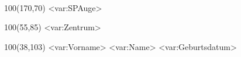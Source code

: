 \documentclass[a4]{scrreprt}
\begin{document}
\baselineskip15pt

~
\textblockorigin{1mm}{1mm}
\setlength{\TPHorizModule}{1mm}
\setlength{\TPVertModule}{1mm}

\begin{textblock}{100}(170,70) 
\noindent {}<var:SPAuge>
\end{textblock}
\begin{textblock}{100}(55,85) 
<var:Zentrum>
\end{textblock}
\begin{textblock}{100}(38,103) 
<var:Vorname> <var:Name>  <var:Geburtsdatum>
\end{textblock}
\end{document}
